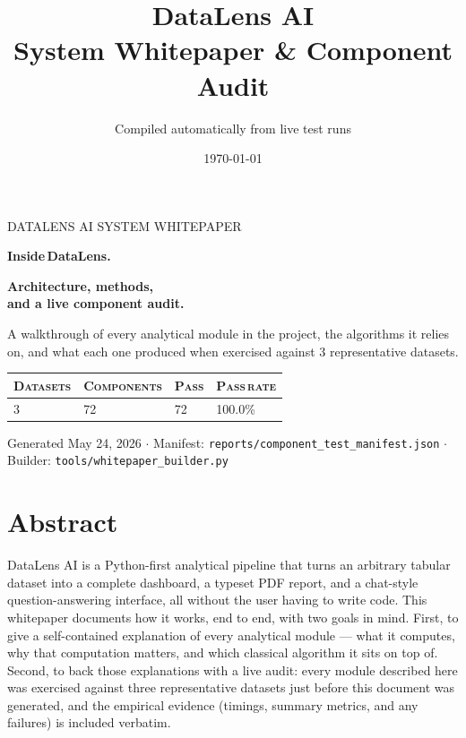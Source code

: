 \documentclass[11pt,a4paper]{article}
\title{\vspace{-2em}\Huge\bfseries DataLens AI \\[0.2em] {\Large System Whitepaper \& Component Audit}}
\author{Compiled automatically from live test runs}
\date{\today}
\newcommand{\eyebrow}[1]{{\color{accent}\fontfamily{cmtt}\selectfont\small\MakeUppercase{#1}}}
\begin{document}
\thispagestyle{empty}

\begin{flushleft}
\eyebrow{DataLens AI \quad{$\boldsymbol{\cdot}$}\quad System Whitepaper}

\vspace{1.2em}
{\fontsize{42}{52}\selectfont\bfseries Inside\,DataLens.}

\vspace{0.4em}
{\fontsize{20}{26}\selectfont\color{accent}\bfseries Architecture, methods,}\\[2pt]
{\fontsize{20}{26}\selectfont\color{accent}\bfseries and a live component audit.}

\vspace{1.6em}
{\large\color{ink2} A walkthrough of every analytical module in the project,
the algorithms it relies on, and what each one produced when exercised against
3 representative datasets.}

\vspace{2em}

\begin{tabularx}{\linewidth}{X X X X}
\toprule
\textsc{Datasets} & \textsc{Components} & \textsc{Pass} & \textsc{Pass\,rate} \\
\midrule
3 & 72 & 72 & 100.0\% \\
\bottomrule
\end{tabularx}

\vfill

{\color{ink3}\footnotesize Generated May 24, 2026
{\quad$\boldsymbol{\cdot}$\quad}
Manifest: \texttt{reports/component\_test\_manifest.json}
{\quad$\boldsymbol{\cdot}$\quad}
Builder: \texttt{tools/whitepaper\_builder.py}}
\end{flushleft}

\newpage


\section*{Abstract}

DataLens AI is a Python-first analytical pipeline that turns an arbitrary
tabular dataset into a complete dashboard, a typeset PDF report, and a
chat-style question-answering interface, all without the user having to
write code. This whitepaper documents how it works, end to end, with two
goals in mind. First, to give a self-contained explanation of every
analytical module --- what it computes, why that computation matters, and
which classical algorithm it sits on top of. Second, to back those
explanations with a live audit: every module described here was exercised
against three representative datasets just before this document was
generated, and the empirical evidence (timings, summary metrics, and any
failures) is included verbatim.
\end{document}

